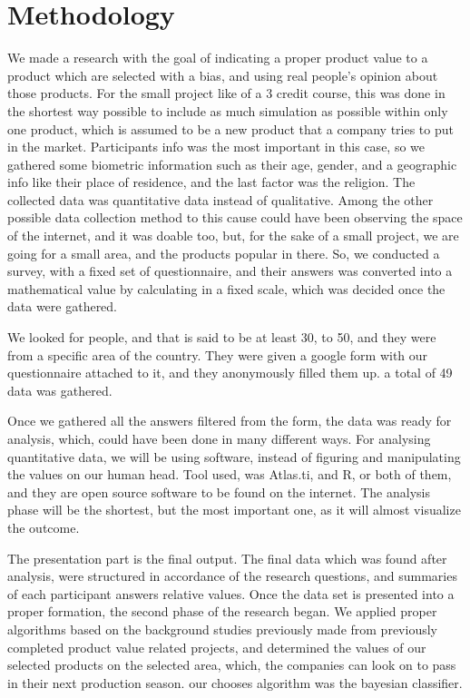 \documentclass[conference]{IEEEtran}
\begin{document}
\section{Methodology}

We made a research with the goal of indicating a proper product value to a product which are selected with a bias, and using real people’s opinion about those products. For the small project like of a 3 credit course, this was done in the shortest way possible to include as much simulation as possible within only one product, which is assumed to be a new product that a company tries to put in the market. Participants info was the most important in this case, so we gathered some biometric information such as their age, gender, and a geographic info like their place of residence, and the last factor was the religion. The collected data was quantitative data instead of qualitative. Among the other possible data collection method to this cause could have been observing the space of the internet, and it was doable too, but, for the sake of a small project, we are going for a small area, and the products popular in there. So, we conducted a survey, with a fixed set of questionnaire, and their answers was converted into a mathematical value by calculating in a fixed scale, which was decided once the data were gathered.

We looked for people, and that is said to be at least 30, to 50, and they were from a specific area of the country. They were given a google form with our questionnaire attached to it, and they anonymously filled them up. a total of 49 data was gathered.

Once we gathered all the answers filtered from the form, the data was ready for analysis, which, could have been done in many different ways. For analysing quantitative data, we will be using software, instead of figuring and manipulating the values on our human head. Tool used, was Atlas.ti, and R, or both of them, and they are open source software to be found on the internet. The analysis phase will be the shortest, but the most important one, as it will almost visualize the outcome.

The presentation part is the final output. The final data which was found after analysis, were structured in accordance of the research questions, and summaries of each participant answers relative values. Once the data set is presented into a proper formation, the second phase of the research began. We applied proper algorithms based on the background studies previously made from previously completed product value related projects, and determined the values of our selected products on the selected area, which, the companies can look on to pass in their next production season. our chooses algorithm was the bayesian classifier. 
\end{document}
